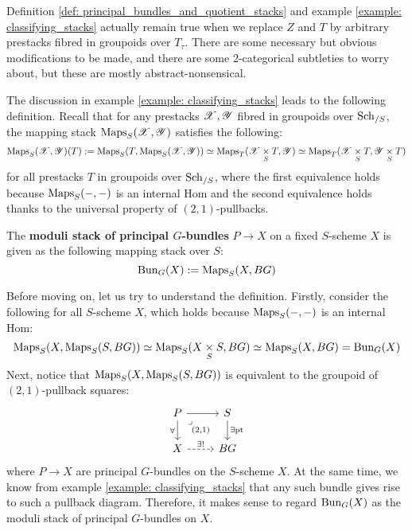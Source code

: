         \begin{remark}
             Definition \ref{def: principal_bundles_and_quotient_stacks} and example \ref{example: classifying_stacks} actually remain true when we replace $Z$ and $T$ by arbitrary prestacks fibred in groupoids over $T_{\tau}$. There are some necessary but obvious modifications to be made, and there are some $2$-categorical subtleties to worry about, but these are mostly abstract-nonsensical.
        \end{remark}

        The discussion in example \ref{example: classifying_stacks} leads to the following definition. Recall that for any prestacks $\mathscr{X}, \mathscr{Y}$ fibred in groupoids over $\mathrm{Sch}_{/S}$, the mapping stack $\mathrm{Maps}_S(\mathscr{X}, \mathscr{Y})$ satisfies the following:
            $$\Maps_S(\scrX, \scrY)(T) := \Maps_S( T, \Maps_S(\scrX, \scrY) ) \cong \Maps_T(\scrX \x_S T, \scrY) \cong \Maps_T(\scrX \x_S T, \scrY \x_S T)$$
        for all prestacks $T$ in groupoids over $\mathrm{Sch}_{/S}$, where the first equivalence holds because $\mathrm{Maps}_S(-, -)$ is an internal Hom and the second equivalence holds thanks to the universal property of $(2, 1)$-pullbacks.
        \begin{definition} \label{def: moduli_stack_of_principal_bundles}
            The \textbf{moduli stack of principal $G$-bundles} $P \to X$ on a fixed $S$-scheme $X$ is given as the following mapping stack over $S$:
                $$\mathrm{Bun}_G(X) := \mathrm{Maps}_S( X, BG )$$
        \end{definition}
        
        Before moving on, let us try to understand the definition. Firstly, consider the following for all $S$-scheme $X$, which holds because $\mathrm{Maps}_S(-, -)$ is an internal Hom:
            $$\Maps_S( X, \Maps_S( S, BG ) ) \cong \Maps_S( X \x_S S, BG ) \cong \Maps_S( X, BG ) = \Bun_G(X)$$
        Next, notice that $\mathrm{Maps}_S( X, \mathrm{Maps}_S( S, BG )  )$ is equivalent to the groupoid of $(2, 1)$-pullback squares:
            $$
                \begin{tikzcd}
                    P & S \\
                    X & BG
                    \arrow[from=1-1, to=1-2]
                    \arrow["\forall"', from=1-1, to=2-1]
                    \arrow["{(2, 1)}"{description}, "\lrcorner"{anchor=center, pos=0.125}, draw=none, from=1-1, to=2-2]
                    \arrow["\exists \pt", from=1-2, to=2-2]
                    \arrow["{\exists!}", dashed, from=2-1, to=2-2]
                \end{tikzcd}
            $$
        where $P \to X$ are principal $G$-bundles on the $S$-scheme $X$. At the same time, we know from example \ref{example: classifying_stacks} that any such bundle gives rise to such a pullback diagram. Therefore, it makes sense to regard $\mathrm{Bun}_G(X)$ as the moduli stack of principal $G$-bundles on $X$.
        
